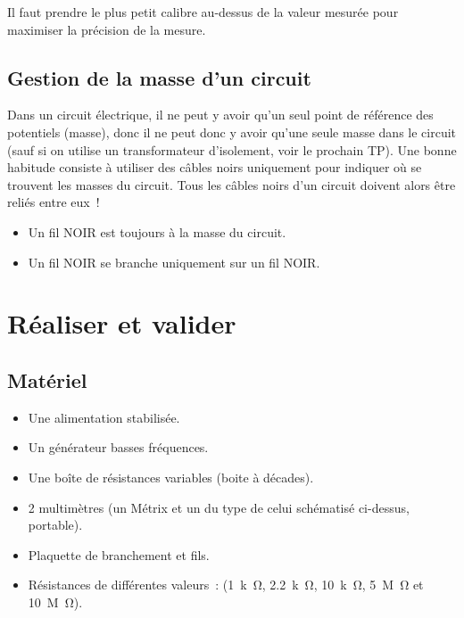 \documentclass[../main/main.tex]{subfiles}
\begin{document}

Il faut prendre le plus petit calibre au-dessus de la valeur mesurée pour
maximiser la précision de la mesure.

\subsection{Gestion de la masse d'un circuit}

Dans un circuit électrique, il ne peut y avoir qu’un seul point de référence des
potentiels (masse), donc il ne peut donc y avoir qu’une seule masse dans le
circuit (sauf si on utilise un transformateur d’isolement, voir le prochain TP).
Une bonne habitude consiste à utiliser des câbles noirs uniquement pour indiquer
où se trouvent les masses du circuit. Tous les câbles noirs d’un circuit doivent
alors être reliés entre eux~!

\begin{itemize}
	\item Un fil NOIR est toujours à la masse du circuit.
	\item Un fil NOIR se branche uniquement sur un fil NOIR.
\end{itemize}

\section{Réaliser et valider}
\subsection{Matériel}

\begin{minipage}{0.49\linewidth}
	\begin{itemize}
		\item Une alimentation stabilisée.
		\item Un générateur basses fréquences.
		\item Une boîte de résistances variables (boite à décades).
		\item 2 multimètres (un Métrix et un du type de celui schématisé
		      ci-dessus, portable).
		\item Plaquette de branchement et fils.
	\end{itemize}
\end{minipage}
\hfill
\begin{minipage}{0.49\linewidth}
	\begin{itemize}
		\item Résistances de différentes valeurs : (\SI{1}{k\ohm},
		      \SI{2.2}{k\ohm}, \SI{10}{k\ohm}, \SI{5}{M\ohm} et \SI{10}{M\ohm}).
	\end{itemize}
\end{minipage}
\end{document}
